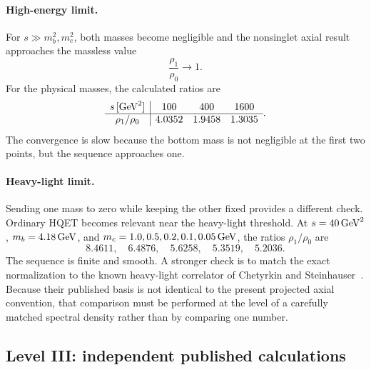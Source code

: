 \documentclass[11pt]{article}
\begin{document}
\paragraph{High-energy limit.}
For \(s\gg m_b^2,m_c^2\), both masses become negligible and the nonsinglet
axial result approaches the massless value
\begin{equation}
 \frac{\rho_1}{\rho_0}\longrightarrow1.
\end{equation}
For the physical masses, the calculated ratios are
\begin{equation}
\begin{array}{c|ccc}
s\,[{\rm GeV}^2]&100&400&1600\\ \hline
\rho_1/\rho_0&4.0352&1.9458&1.3035
\end{array}.
\end{equation}
The convergence is slow because the bottom mass is not negligible at the
first two points, but the sequence approaches one.

\paragraph{Heavy-light limit.}
Sending one mass to zero while keeping the other fixed provides a different
check.  Ordinary HQET becomes relevant near the heavy-light threshold.  At
\(s=40\,{\rm GeV}^2\), \(m_b=4.18\,{\rm GeV}\), and
\(m_c=1.0,0.5,0.2,0.1,0.05\,{\rm GeV}\), the ratios
\(\rho_1/\rho_0\) are
\begin{equation}
 8.4611,\quad6.4876,\quad5.6258,\quad5.3519,\quad5.2036.
\end{equation}
The sequence is finite and smooth.  A stronger check is to match the exact
normalization to the known heavy-light correlator of
Chetyrkin and Steinhauser~\cite{ChetyrkinSteinhauser2001}.  Because their
published basis is not identical to the present projected axial convention,
that comparison must be performed at the level of a carefully matched
spectral density rather than by comparing one number.

\subsection{Level III: independent published calculations}
\end{document}

